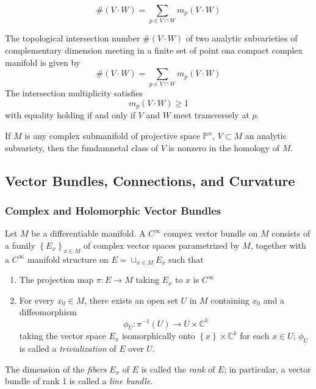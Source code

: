 \begin{prop}
	\[
		\# \left( V \cdot W \right) = \sum_{p \in V \cap W} m_p \left( V \cdot W \right)
	\]
	
\end{prop}

\begin{thm}
	The topological intersection number $ \# \left( V \cdot W \right)$ of two analytic subvarieties of complementary dimension meeting in a finite set of point ona compact complex manifold is given by 
	\[
		\# \left( V \cdot W \right) = \sum_{p \in V \cap W} m_p (V \cdot W)
	\]
	The intersection multiplicity satisfies
	\[
		m_p \left( V \cdot W \right) \geq 1
	\]
	with equality holding if and only if $V$ and $W$ meet transversely at $p$.
\end{thm}

\begin{cor}
	If $M$ is any complex submanifold of projective space $ \mathbb{P}^n$, $ V \subset M$ an analytic subvariety, then the fundamnetal class of $V$ is nonzero in the homology of $M$.
\end{cor}

\subsection{Vector Bundles, Connections, and Curvature}
\subsubsection{Complex and Holomorphic Vector Bundles}

\begin{defn}
	Let $M$ be a differentiable manifold. A $ C^{\infty}$ compex vector bundle on $M$ consists of a family $ \left\{ E_x \right\}_{x \in M}$ of complex vector spaces parametrized by $M$, together with a $ C^{\infty}$ manifold structure on $E = \cup_{x \in M} E_x$ such that
	\begin{enumerate}
		\item The projection map $ \pi: E \to M$ taking $E_x$ to $x$ is $ C^{\infty}$
		\item For every $x_0 \in M$, there exists an open set $U$ in $M$ containing $x_0$ and a diffeomorphism
			\[
				\phi_U: \pi^{-1} \left( U \right) \to U \times \mathbb{C}^k
			\]
			taking the vector space $E_x$ isomorphically onto $ \left\{ x \right\} \times \mathbb{C}^k$ for each $x \in U$; $ \phi_U$ is called a \textit{trivialization} of $E$ over $U$.
	\end{enumerate}
	The dimension of the \textit{fibers} $E_x$ of $E$ is called the \textit{rank} of $E$; in particular, a vector bundle of rank 1 is called a \textit{line bundle}.
\end{defn}

